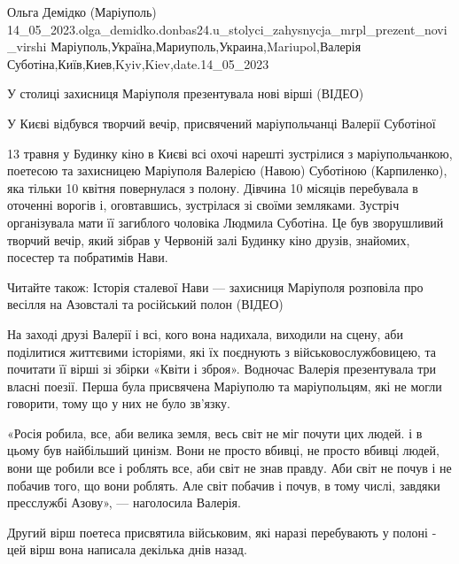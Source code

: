  
 
 
 
 

Ольга Демідко (Маріуполь)
14_05_2023.olga_demidko.donbas24.u_stolyci_zahysnycja_mrpl_prezent_novi_virshi
Маріуполь,Україна,Мариуполь,Украина,Mariupol,Валерія Суботіна,Київ,Киев,Kyiv,Kiev,date.14_05_2023

У столиці захисниця Маріуполя презентувала нові вірші (ВІДЕО)

У Києві відбувся творчий вечір, присвячений маріупольчанці Валерії Суботіної

13 травня у Будинку кіно в Києві всі охочі нарешті зустрілися з
маріупольчанкою, поетесою та захисницею Маріуполя Валерією (Навою) Суботіною
(Карпиленко), яка тільки 10 квітня повернулася з полону. Дівчина 10 місяців
перебувала в оточенні ворогів і, оговтавшись, зустрілася зі своїми земляками.
Зустріч організувала мати її загиблого чоловіка Людмила Суботіна. Це був
зворушливий творчий вечір, який зібрав у Червоній залі Будинку кіно друзів,
знайомих, посестер та побратимів Нави.

Читайте також: Історія сталевої Нави — захисниця Маріуполя розповіла про весілля на Азовсталі та російський полон (ВІДЕО)

На заході друзі Валерії і всі, кого вона надихала, виходили на сцену, аби
поділитися життєвими історіями, які їх поєднують з військовослужбовицею, та
почитати її вірші зі збірки «Квіти і зброя». Водночас Валерія презентувала три
власні поезії. Перша була присвячена Маріуполю та маріупольцям, які не могли
говорити, тому що у них не було зв'язку. 

«Росія робила, все, аби велика земля, весь світ не міг почути цих людей. і в
цьому був найбільший цинізм. Вони не просто вбивці, не просто вбивці людей,
вони ще робили все і роблять все, аби світ не знав правду. Аби світ не почув і
не побачив того, що вони роблять. Але світ побачив і почув, в тому числі,
завдяки пресслужбі Азову», — наголосила Валерія.

Другий вірш поетеса присвятила військовим, які наразі перебувають у полоні -
цей вірш вона написала декілька днів назад.

